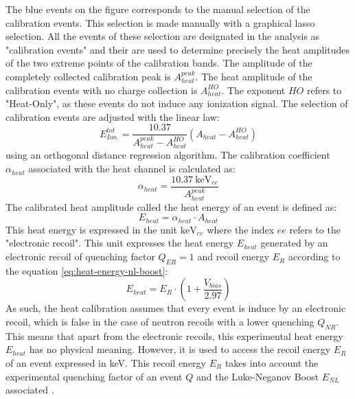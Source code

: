 The blue events on the figure corresponds to the manual selection of the calibration events. This selection is made manually with a graphical lasso selection. All the events of these selection are designated in the analysis as "calibration events" and their are used to determine precisely the heat amplitudes of the two extreme points of the calibration bands. The  amplitude of the completely collected calibration peak is $A_{heat}^{peak}$. The heat amplitude of the calibration events with no charge collection is  $A_{heat}^{HO}$. The exponent $HO$ refers to "Heat-Only", as these events do not induce any ionization signal. The selection of calibration events are adjusted with the linear law:
\begin{equation}
E_{Ion.}^{tot} = \frac{10.37}{A_{heat}^{peak} - A_{heat}^{HO}} (A_{heat} - A_{heat}^{HO})
\end{equation}
using an orthogonal distance regression algorithm. The calibration coefficient $\alpha_{heat}$ associated with the heat channel is calculated as:
\begin{equation}
\alpha_{heat} = \frac{\SI{10.37}{\kilo\eV_{ee}}}{A_{heat}^{peak}}
\end{equation}
The calibrated heat amplitude called the heat energy of an event is defined as:
\begin{equation}
E_{heat} = \alpha_{heat} \cdot A_{heat}
\end{equation}
This heat energy is expressed in the unit $\si{\kilo\eV_{ee}}$ where the index $ee$ refers to the "electronic recoil". This unit expresses the heat energy $E_{heat}$ generated by an electronic recoil of quenching factor $Q_{ER}=1$ and recoil energy $E_R$ according to the equation \ref{eq:heat-energy-nl-boost}:
\begin{equation}
E_{heat} = E_R \cdot \left( 1 + \frac{V_{bias}}{2.97} \right)
\end{equation}
As such, the heat calibration assumes that every event is induce by an electronic recoil, which is false in the case of neutron recoils with a lower quenching $Q_{NR}$. This means that apart from the electronic recoils, this experimental heat energy $E_{heat}$ has no physical meaning. However, it is used to access the recoil energy $E_R$ of an event expressed in \si{\kilo\eV}. This recoil energy $E_R$ takes into account the experimental quenching factor of an event $Q$ and the Luke-Neganov Boost $E_{NL}$ associated . 

